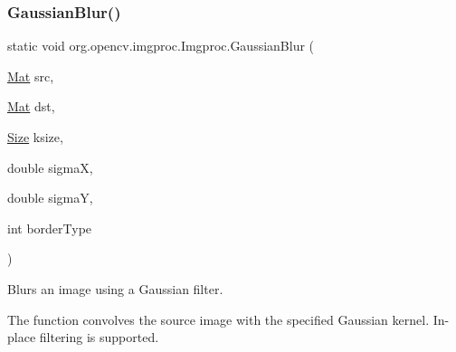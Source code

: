 \subsubsection{\texorpdfstring{Gaussian\+Blur()}{GaussianBlur()}\hspace{0.1cm}{\footnotesize\ttfamily [1/3]}}
{\footnotesize\ttfamily static void org.\+opencv.\+imgproc.\+Imgproc.\+Gaussian\+Blur (\begin{DoxyParamCaption}\item[{\mbox{\hyperlink{classorg_1_1opencv_1_1core_1_1_mat}{Mat}}}]{src,  }\item[{\mbox{\hyperlink{classorg_1_1opencv_1_1core_1_1_mat}{Mat}}}]{dst,  }\item[{\mbox{\hyperlink{classorg_1_1opencv_1_1core_1_1_size}{Size}}}]{ksize,  }\item[{double}]{sigmaX,  }\item[{double}]{sigmaY,  }\item[{int}]{border\+Type }\end{DoxyParamCaption})\hspace{0.3cm}{\ttfamily [static]}}

Blurs an image using a Gaussian filter.

The function convolves the source image with the specified Gaussian kernel. In-\/place filtering is supported.


